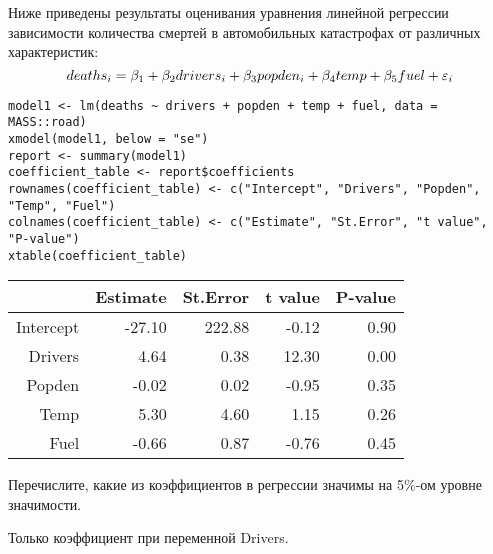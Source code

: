 \begin{problem}
Ниже приведены результаты оценивания уравнения линейной регрессии зависимости количества смертей в автомобильных катастрофах от различных характеристик:
\[
deaths_i = \beta_1 + \beta_2 drivers_i + \beta_3 popden_i + \beta_4  temp + \beta_5 fuel + \varepsilon_i
\]
\begin{verbatim}
model1 <- lm(deaths ~ drivers + popden + temp + fuel, data = MASS::road)
xmodel(model1, below = "se")
report <- summary(model1)
coefficient_table <- report$coefficients
rownames(coefficient_table) <- c("Intercept", "Drivers", "Popden", "Temp", "Fuel")
colnames(coefficient_table) <- c("Estimate", "St.Error", "t value", "P-value")
xtable(coefficient_table)
\end{verbatim}

\begin{tabular}{rrrrr}
  \hline
 & Estimate & St.Error & t value & P-value \\
  \hline
Intercept & -27.10 & 222.88 & -0.12 & 0.90 \\
  Drivers & 4.64 & 0.38 & 12.30 & 0.00 \\
  Popden & -0.02 & 0.02 & -0.95 & 0.35 \\
  Temp & 5.30 & 4.60 & 1.15 & 0.26 \\
  Fuel & -0.66 & 0.87 & -0.76 & 0.45 \\
   \hline
\end{tabular}


Перечислите, какие из коэффициентов в регрессии значимы на 5\%-ом уровне значимости.

\begin{sol}
Только коэффициент при переменной Drivers.
\end{sol}
\end{problem}



